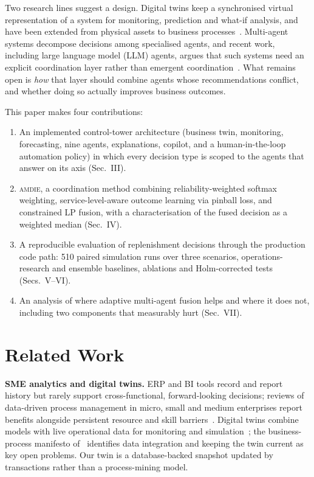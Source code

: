 \documentclass[conference]{IEEEtran}
\newcommand{\amdie}{\textsc{amdie}}
\begin{document}
Two research lines suggest a design. Digital twins keep a synchronised virtual representation of a system for monitoring, prediction and what-if analysis, and have been extended from physical assets to business processes~\cite{tao2019,fornari2025}. Multi-agent systems decompose decisions among specialised agents, and recent work, including large language model (LLM) agents, argues that such systems need an explicit coordination layer rather than emergent coordination~\cite{jin2025,adimulam2026}. What remains open is \emph{how} that layer should combine agents whose recommendations conflict, and whether doing so actually improves business outcomes.

This paper makes four contributions:
\begin{enumerate}
\item An implemented control-tower architecture (business twin, monitoring, forecasting, nine agents, explanations, copilot, and a human-in-the-loop automation policy) in which every decision type is scoped to the agents that answer on its axis (Sec.~III).
\item \amdie{}, a coordination method combining reliability-weighted softmax weighting, service-level-aware outcome learning via pinball loss, and constrained LP fusion, with a characterisation of the fused decision as a weighted median (Sec.~IV).
\item A reproducible evaluation of replenishment decisions through the production code path: 510 paired simulation runs over three scenarios, operations-research and ensemble baselines, ablations and Holm-corrected tests (Secs.~V--VI).
\item An analysis of where adaptive multi-agent fusion helps and where it does not, including two components that measurably hurt (Sec.~VII).
\end{enumerate}

\section{Related Work}
\textbf{SME analytics and digital twins.} ERP and BI tools record and report history but rarely support cross-functional, forward-looking decisions; reviews of data-driven process management in micro, small and medium enterprises report benefits alongside persistent resource and skill barriers~\cite{garciavidal2025,maroufkhani2020}. Digital twins combine models with live operational data for monitoring and simulation~\cite{tao2019}; the business-process manifesto of~\cite{fornari2025} identifies data integration and keeping the twin current as key open problems. Our twin is a database-backed snapshot updated by transactions rather than a process-mining model.
\end{document}
